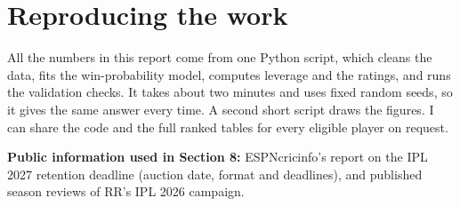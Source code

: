 \documentclass[10.5pt,a4paper]{article}
\begin{document}
\section{Reproducing the work}

All the numbers in this report come from one Python script, which cleans the data, fits the win-probability model, computes leverage and the ratings, and runs the validation checks. It takes about two minutes and uses fixed random seeds, so it gives the same answer every time. A second short script draws the figures. I can share the code and the full ranked tables for every eligible player on request.

\textbf{Public information used in Section 8:} ESPNcricinfo's report on the IPL 2027 retention deadline (auction date, format and deadlines), and published season reviews of RR's IPL 2026 campaign.
\end{document}
